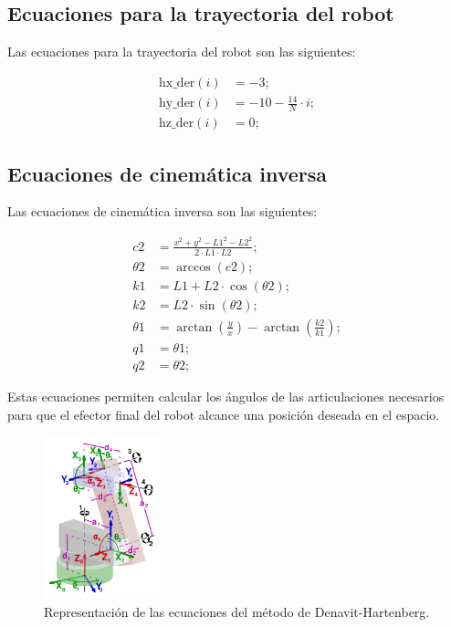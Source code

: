 \documentclass[final]{foresj}
\begin{document}
\subsection{Ecuaciones para la trayectoria del robot}

Las ecuaciones para la trayectoria del robot son las siguientes:

\begin{align*}
\text{hx\_der}(i) &= -3; \\
\text{hy\_der}(i) &= -10 - \frac{14}{N} \cdot i; \\
\text{hz\_der}(i) &= 0;
\end{align*}

\subsection{Ecuaciones de cinemática inversa}

Las ecuaciones de cinemática inversa son las siguientes:

\begin{align*}
c2 &= \frac{x^2 + y^2 - L1^2 - L2^2}{2 \cdot L1 \cdot L2}; \\
\theta2 &= \arccos(c2); \\
k1 &= L1 + L2 \cdot \cos(\theta2); \\
k2 &= L2 \cdot \sin(\theta2); \\
\theta1 &= \arctan\left(\frac{y}{x}\right) - \arctan\left(\frac{k2}{k1}\right); \\
q1 &= \theta1; \\
q2 &= \theta2;
\end{align*}

Estas ecuaciones permiten calcular los ángulos de las articulaciones necesarios para que el efector final del robot alcance una posición deseada en el espacio.

\begin{figure}[ht]
\centering
\includegraphics[width=0.3\textwidth]{DH.png}
\caption{Representación de las ecuaciones del método de Denavit-Hartenberg.}
\label{fig:my_label}
\end{figure}
\end{document}
